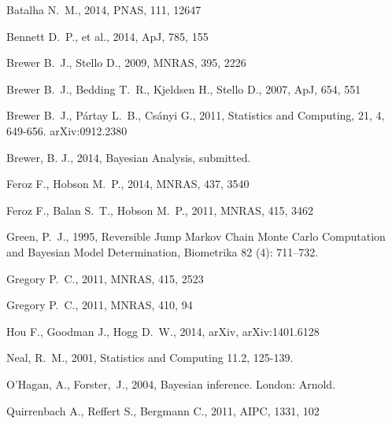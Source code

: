 \documentclass[useAMS,usenatbib]{mn2e}
\begin{document}
\begin{thebibliography}{99}
Batalha N.~M., 2014, PNAS, 111, 12647 

 Bennett D.~P., et al., 2014, ApJ, 785, 155 

 Brewer B.~J., Stello D., 2009, MNRAS, 395, 2226 

Brewer B.~J., Bedding T.~R., Kjeldsen H., Stello D., 2007, ApJ, 654, 551 

 Brewer B.~J., P{\'a}rtay L.~B., Cs{\'a}nyi G., 2011,
Statistics and Computing, 21, 4, 649-656. arXiv:0912.2380

 Brewer, B. J., 2014,
Bayesian Analysis, submitted.

 Feroz F., Hobson M.~P., 2014, MNRAS, 437, 3540 

 Feroz F., Balan S.~T., Hobson M.~P., 2011, MNRAS, 415, 3462

Green, P.~J., 1995, Reversible Jump Markov Chain Monte Carlo Computation and Bayesian Model Determination, Biometrika 82 (4): 711–732.

Gregory P.~C., 2011, MNRAS, 415, 2523 

Gregory P.~C., 2011, MNRAS, 410, 94 

 Hou F., Goodman J., Hogg D.~W., 2014, arXiv, arXiv:1401.6128 

Neal, R.~M., 2001, Statistics and Computing 11.2, 125-139.

O'Hagan, A., Forster,~J., 2004, Bayesian inference. London: Arnold.

 Quirrenbach A., Reffert S., Bergmann C., 2011, AIPC, 1331, 102 


\end{thebibliography}
\end{document}
